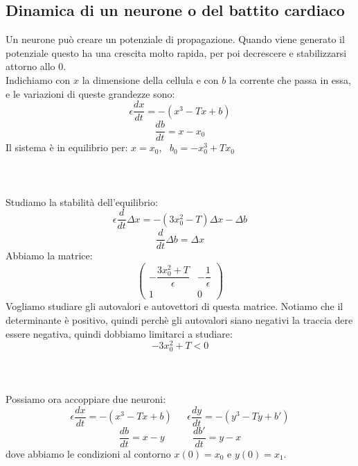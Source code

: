 \documentclass[12pt]{article}
\begin{document}
\subsection{Dinamica di un neurone o del battito cardiaco}
Un neurone può creare un potenziale di propagazione. Quando viene generato il potenziale questo ha una crescita molto rapida, per poi decrescere e stabilizzarsi attorno allo 0. \\
Indichiamo con $x$ la dimensione della cellula e con $b$ la corrente che passa in essa, e le variazioni di queste grandezze sono:
$$
	\epsilon\frac{dx}{dt} = -(x^3 - Tx + b)
$$
$$
	\frac{db}{dt} = x - x_0
$$
Il sistema è in equilibrio per: $x = x_0$, \ $b_0 = -x_0^3 + Tx_0$ \\ \\ \\ \\
Studiamo la stabilità dell'equilibrio:
$$
	\epsilon \frac{d}{dt}\Delta x = -(3x_0^2-T)\Delta x - \Delta b
$$
$$
	\frac{d}{dt}\Delta b = \Delta x
$$	
Abbiamo la matrice:
$$
	\begin{pmatrix}
	-\dfrac{3x_0^2 + T}{\epsilon} & -\dfrac{1}{\epsilon} \\
	1 & 0
	\end{pmatrix}
$$
Vogliamo studiare gli autovalori e autovettori di questa matrice. Notiamo che il determinante è positivo, quindi perchè gli autovalori siano negativi la traccia dere essere negativa, quindi dobbiamo limitarci a studiare:
$$
	-3x_0^2 + T < 0
$$ \\ \\ \\
Possiamo ora accoppiare due neuroni:
$$
	\epsilon\frac{dx}{dt} = -(x^3 - Tx + b) \ \ \ \ \ \ \ \epsilon\frac{dy}{dt} = -(y^3 - Ty + b')
$$
$$
	\frac{db}{dt} = x - y \ \ \ \ \ \ \ \ \ \ \ \ \ \frac{db'}{dt} = y - x
$$
dove abbiamo le condizioni al contorno $x(0) = x_0$ e $y(0) = x_1$. \\ \\ \\ 
\end{document}
